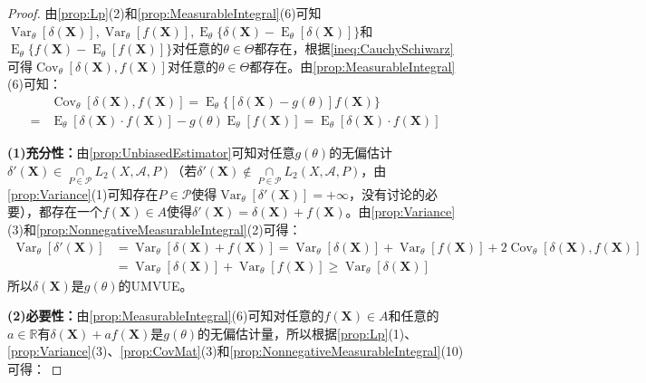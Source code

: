 \begin{proof}
	由\cref{prop:Lp}(2)和\cref{prop:MeasurableIntegral}(6)可知$\operatorname{Var}_{\theta}[\delta(\mathbf{X})],\operatorname{Var}_{\theta}[f(\mathbf{X})],\operatorname{E}_{\theta}\{\delta(\mathbf{X})-\operatorname{E}_{\theta}[\delta(\mathbf{X})]\}$和$\operatorname{E}_{\theta}\{f(\mathbf{X})-\operatorname{E}_{\theta}[f(\mathbf{X})]\}$对任意的$\theta\in\Theta$都存在，根据\cref{ineq:CauchySchiwarz}可得$\operatorname{Cov}_{\theta}[\delta(\mathbf{X}),f(\mathbf{X})]$对任意的$\theta\in\Theta$都存在。由\cref{prop:MeasurableIntegral}(6)可知：
	\begin{align*}
		&\operatorname{Cov}_{\theta}[\delta(\mathbf{X}),f(\mathbf{X})]=\operatorname{E}_{\theta}\{[\delta(\mathbf{X})-g(\theta)]f(\mathbf{X})\} \\
		=&\operatorname{E}_{\theta}[\delta(\mathbf{X})\cdot f(\mathbf{X})]-g(\theta)\operatorname{E}_{\theta}[f(\mathbf{X})]=\operatorname{E}_{\theta}[\delta(\mathbf{X})\cdot f(\mathbf{X})]
	\end{align*}\par
	\textbf{(1)充分性：}由\cref{prop:UnbiasedEstimator}可知对任意$g(\theta)$的无偏估计$\delta'(\mathbf{X})\in\underset{P\in\mathscr{P}}{\cap}L_2(X,\mathscr{A},P)$（若$\delta'(\mathbf{X})\notin\underset{P\in\mathscr{P}}{\cap}L_2(X,\mathscr{A},P)$，由\cref{prop:Variance}(1)可知存在$P\in\mathscr{P}$使得$\operatorname{Var}_{\theta}[\delta'(\mathbf{X})]=+\infty$，没有讨论的必要），都存在一个$f(\mathbf{X})\in A$使得$\delta'(\mathbf{X})=\delta(\mathbf{X})+f(\mathbf{X})$。由\cref{prop:Variance}(3)和\cref{prop:NonnegativeMeasurableIntegral}(2)可得：
	\begin{align*}
		\operatorname{Var}_{\theta}[\delta'(\mathbf{X})]&=\operatorname{Var}_{\theta}[\delta(\mathbf{X})+f(\mathbf{X})]=\operatorname{Var}_{\theta}[\delta(\mathbf{X})]+\operatorname{Var}_{\theta}[f(\mathbf{X})]+2\operatorname{Cov}_{\theta}[\delta(\mathbf{X}),f(\mathbf{X})] \\
		&=\operatorname{Var}_{\theta}[\delta(\mathbf{X})]+\operatorname{Var}_{\theta}[f(\mathbf{X})]\geqslant\operatorname{Var}_{\theta}[\delta(\mathbf{X})]
	\end{align*}
	所以$\delta(\mathbf{X})$是$g(\theta)$的UMVUE。\par
	\textbf{(2)必要性：}由\cref{prop:MeasurableIntegral}(6)可知对任意的$f(\mathbf{X})\in A$和任意的$a\in\mathbb{R}$有$\delta(\mathbf{X})+af(\mathbf{X})$是$g(\theta)$的无偏估计量，所以根据\cref{prop:Lp}(1)、\cref{prop:Variance}(3)、\cref{prop:CovMat}(3)和\cref{prop:NonnegativeMeasurableIntegral}(10)可得：

\end{proof}
